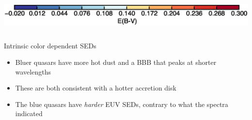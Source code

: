 \documentclass[landscape,9pt]{beamer}
\begin{document}
\begin{frame}
\begin{columns}
\begin{column}{.75\textwidth}
\\
			\hspace{3mm}\includegraphics[width=.95\textwidth]{../images/BH/ebv_colorbar}
		\end{column}
	\end{columns}
\end{frame}

\begin{frame}
	\begin{columns}
		\begin{column}{.35\textwidth}
			\begin{block}{Intrinsic color dependent SEDs}
			\begin{itemize}
				\item<1> Bluer quasars have more hot dust and a BBB that peaks at shorter wavelengths
				\item<1> These are both consistent with a hotter accretion disk
				\item<2> The blue quasars have {\em harder} EUV SEDs, contrary to what the spectra indicated
			\end{itemize}
			\end{block}
		\end{column}
		\begin{column}{.75\textwidth}
\end{column}
\end{columns}
\end{frame}
\end{document}
